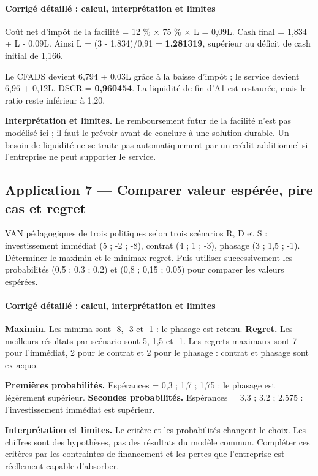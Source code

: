 \documentclass[12pt,a4paper]{article}
\begin{document}
\paragraph{Corrigé détaillé : calcul, interprétation et limites}
Coût net d’impôt de la facilité = 12 \% $\times$ 75 \% $\times$ L = 0,09L. Cash final = 1,834 + L - 0,09L. Ainsi L = (3 - 1,834)/0,91 = \textbf{1,281319}, supérieur au déficit de cash initial de 1,166.

Le CFADS devient 6,794 + 0,03L grâce à la baisse d’impôt ; le service devient 6,96 + 0,12L. DSCR = \textbf{0,960454}. La liquidité de fin d’A1 est restaurée, mais le ratio reste inférieur à 1,20.

\textbf{Interprétation et limites.} Le remboursement futur de la facilité n’est pas modélisé ici ; il faut le prévoir avant de conclure à une solution durable. Un besoin de liquidité ne se traite pas automatiquement par un crédit additionnel si l’entreprise ne peut supporter le service.


\subsection*{Application 7 --- Comparer valeur espérée, pire cas et regret}
VAN pédagogiques de trois politiques selon trois scénarios R, D et S : investissement immédiat (5 ; -2 ; -8), contrat (4 ; 1 ; -3), phasage (3 ; 1,5 ; -1). Déterminer le maximin et le minimax regret. Puis utiliser successivement les probabilités (0,5 ; 0,3 ; 0,2) et (0,8 ; 0,15 ; 0,05) pour comparer les valeurs espérées.


\paragraph{Corrigé détaillé : calcul, interprétation et limites}
\textbf{Maximin.} Les minima sont -8, -3 et -1 : le phasage est retenu. \textbf{Regret.} Les meilleurs résultats par scénario sont 5, 1,5 et -1. Les regrets maximaux sont 7 pour l’immédiat, 2 pour le contrat et 2 pour le phasage : contrat et phasage sont ex æquo.

\textbf{Premières probabilités.} Espérances = 0,3 ; 1,7 ; 1,75 : le phasage est légèrement supérieur. \textbf{Secondes probabilités.} Espérances = 3,3 ; 3,2 ; 2,575 : l’investissement immédiat est supérieur.

\textbf{Interprétation et limites.} Le critère et les probabilités changent le choix. Les chiffres sont des hypothèses, pas des résultats du modèle commun. Compléter ces critères par les contraintes de financement et les pertes que l’entreprise est réellement capable d’absorber.
\end{document}
